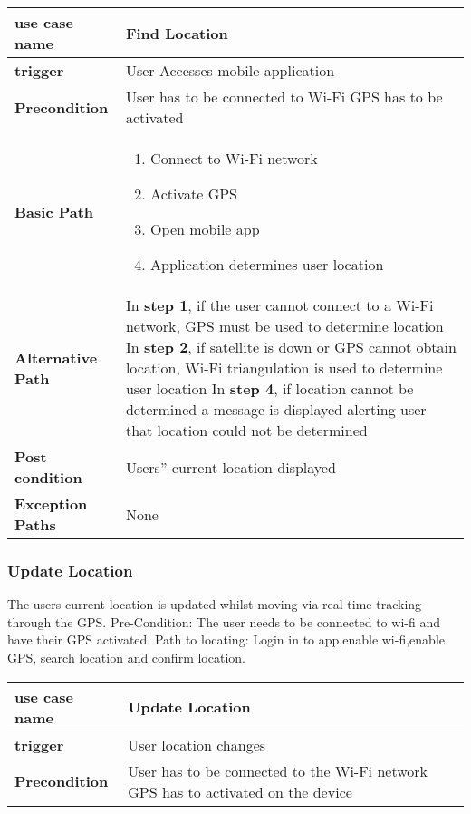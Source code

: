 \documentclass{article}
\begin{document}
\begin{center}
\begin{tabu} to 0.8\textwidth { | X[l] | X[c]| }
 \hline

\textbf{use case name} & Find Location \\
 \hline
\textbf{trigger} & User Accesses mobile application    \\
 \hline
\textbf{Precondition} &User has to be connected to Wi-Fi
GPS has to be activated


    \\
\hline
\textbf{Basic Path} & 
\begin{enumerate}
  \item Connect to Wi-Fi network
  \item Activate GPS
  \item Open mobile app
  \item Application determines user location
\end{enumerate}  \\
\hline
\textbf{Alternative Path} & In\textbf{ step 1}, if the user cannot connect to a Wi-Fi network, GPS must be used to determine location
  \newline In \textbf{step 2}, if satellite is down or GPS cannot obtain location, Wi-Fi triangulation is used to determine user location
 \newline  In \textbf{step 4}, if location cannot be determined a message is displayed alerting user that location could not be determined

 \\
\hline
\textbf{Post condition} & Users'' current location displayed   \\
\hline
\textbf{Exception Paths} & None    \\
\hline
\end{tabu}
\newpage
\subsubsection{Update Location}
The users current location is updated whilst moving via real time tracking through the GPS. Pre-Condition: The user needs to be connected to wi-fi and have their GPS activated. Path to locating: Login in to app,enable wi-fi,enable GPS, search location and confirm location.
\begin{tabu} to 0.8\textwidth { | X[l] | X[c]| }
 \hline

\textbf{use case name} & Update Location \\
 \hline
\textbf{trigger} & User location changes    \\
 \hline
\textbf{Precondition} & User has to be connected to the Wi-Fi network
GPS has to activated on the device



\end{tabu}
\end{center}
\end{document}
